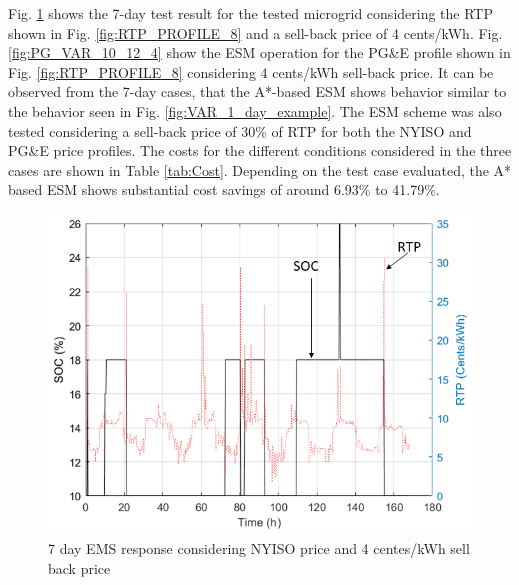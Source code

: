 Fig. \ref{fig:VAR_10_12_4} shows the 7-day test result for the tested microgrid considering the RTP shown in Fig. \ref{fig:RTP_PROFILE_8} and a sell-back price of 4 cents/kWh. Fig. \ref{fig:PG_VAR_10_12_4} show the ESM operation for the PG\&E profile shown in Fig. \ref{fig:RTP_PROFILE_8} considering 4 cents/kWh sell-back price. It can be observed from the 7-day cases, that the A*-based ESM shows behavior similar to the behavior seen in  Fig. \ref{fig:VAR_1_day_example}. The ESM scheme was also tested considering a sell-back price of 30\% of RTP for both the NYISO and PG\&E price profiles. The costs for the different conditions considered in the three cases are shown in Table \ref{tab:Cost}. Depending on the test case evaluated, the A* based ESM shows substantial cost savings of around 6.93\% to 41.79\%. 

 \begin{figure}[!ht]
    \centering
    \includegraphics[width = 0.8\linewidth]{figs/VAR_10_12_4.png}
    \caption{7 day EMS response considering NYISO price and 4 centes/kWh sell back price}
    \label{fig:VAR_10_12_4}
\end{figure}


